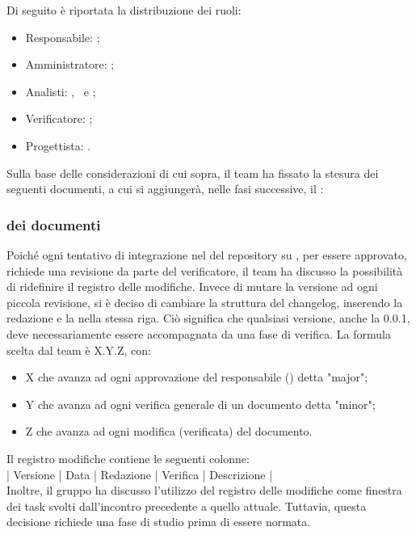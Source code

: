 \vspace{0.5\baselineskip}
Di seguito è riportata la distribuzione dei ruoli:
\begin{itemize}
	\item Responsabile: \riccardo;
	\item Amministratore: \tommaso;
	\item Analisti: \marco, \martina \ e \sebastiano;
	\item Verificatore: \raul;
	\item Progettista: \mattia.
\end{itemize}

\vspace{0.5\baselineskip}
Sulla base delle considerazioni di cui sopra, il team ha fissato la stesura dei seguenti documenti, a cui si aggiungerà, nelle fasi successive, il \PdQ:

\subsubsection{ dei documenti} \label{sec:versionamento}
Poiché ogni tentativo di integrazione nel  del repository su , per essere approvato, richiede una revisione da parte del verificatore, il team ha discusso la possibilità di ridefinire il registro delle modifiche. Invece di mutare la versione ad ogni piccola revisione, si è deciso di cambiare la struttura del changelog, inserendo la redazione e la  nella stessa riga. Ciò significa che qualsiasi versione, anche la 0.0.1, deve necessariamente essere accompagnata da una fase di verifica. La formula scelta dal team è X.Y.Z, con:
\begin{itemize}
	\item X che avanza ad ogni approvazione del responsabile () detta "major";
	\item Y che avanza ad ogni verifica generale di un documento detta "minor";
	\item Z che avanza ad ogni modifica (verificata) del documento.
\end{itemize}

\vspace{0.5\baselineskip}
Il registro modifiche contiene le seguenti colonne: \\
\vspace{\baselineskip}
\hspace{1cm} | Versione | Data | Redazione | Verifica | Descrizione | \\
Inoltre, il gruppo ha discusso l'utilizzo del registro delle modifiche come finestra dei task svolti dall'incontro precedente a quello attuale. Tuttavia, questa decisione richiede una fase di studio prima di essere normata.

